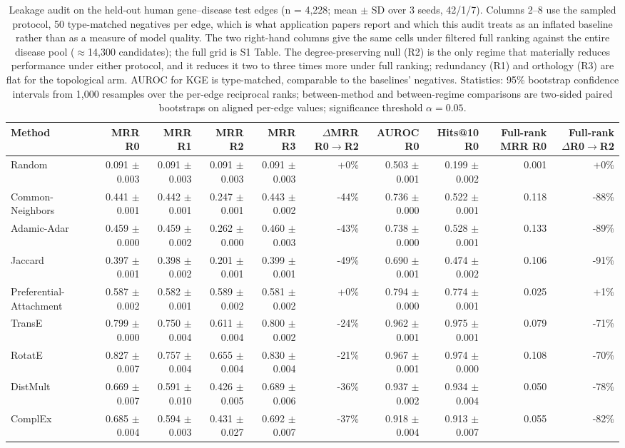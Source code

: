 \begin{table}[H]
\centering
\caption{Leakage audit on the held-out human gene--disease test edges (n = 4,228; mean $\pm$ SD over 3 seeds, 42/1/7). Columns 2--8 use the sampled protocol, 50 type-matched negatives per edge, which is what application papers report and which this audit treats as an inflated baseline rather than as a measure of model quality. The two right-hand columns give the same cells under filtered full ranking against the entire disease pool ($\approx$14,300 candidates); the full grid is S1 Table. The degree-preserving null (R2) is the only regime that materially reduces performance under either protocol, and it reduces it two to three times more under full ranking; redundancy (R1) and orthology (R3) are flat for the topological arm. AUROC for KGE is type-matched, comparable to the baselines' negatives. Statistics: 95\% bootstrap confidence intervals from 1,000 resamples over the per-edge reciprocal ranks; between-method and between-regime comparisons are two-sided paired bootstraps on aligned per-edge values; significance threshold $\alpha = 0.05$.}
\label{tab:audit}
\begin{tabular}{lrrrrrrrrr}
\toprule
Method & MRR R0 & MRR R1 & MRR R2 & MRR R3 & $\Delta$MRR R0$\to$R2 & AUROC R0 & Hits@10 R0 & Full-rank MRR R0 & Full-rank $\Delta$R0$\to$R2 \\
\midrule
Random & 0.091 $\pm$ 0.003 & 0.091 $\pm$ 0.003 & 0.091 $\pm$ 0.003 & 0.091 $\pm$ 0.003 & +0\% & 0.503 $\pm$ 0.001 & 0.199 $\pm$ 0.002 & 0.001 & +0\% \\
Common-Neighbors & 0.441 $\pm$ 0.001 & 0.442 $\pm$ 0.001 & 0.247 $\pm$ 0.001 & 0.443 $\pm$ 0.002 & -44\% & 0.736 $\pm$ 0.000 & 0.522 $\pm$ 0.001 & 0.118 & -88\% \\
Adamic-Adar & 0.459 $\pm$ 0.000 & 0.459 $\pm$ 0.002 & 0.262 $\pm$ 0.000 & 0.460 $\pm$ 0.003 & -43\% & 0.738 $\pm$ 0.000 & 0.528 $\pm$ 0.001 & 0.133 & -89\% \\
Jaccard & 0.397 $\pm$ 0.001 & 0.398 $\pm$ 0.002 & 0.201 $\pm$ 0.001 & 0.399 $\pm$ 0.001 & -49\% & 0.690 $\pm$ 0.001 & 0.474 $\pm$ 0.002 & 0.106 & -91\% \\
Preferential-Attachment & 0.587 $\pm$ 0.002 & 0.582 $\pm$ 0.001 & 0.589 $\pm$ 0.002 & 0.581 $\pm$ 0.002 & +0\% & 0.794 $\pm$ 0.000 & 0.774 $\pm$ 0.001 & 0.025 & +1\% \\
TransE & 0.799 $\pm$ 0.000 & 0.750 $\pm$ 0.004 & 0.611 $\pm$ 0.004 & 0.800 $\pm$ 0.002 & -24\% & 0.962 $\pm$ 0.001 & 0.975 $\pm$ 0.001 & 0.079 & -71\% \\
RotatE & 0.827 $\pm$ 0.007 & 0.757 $\pm$ 0.004 & 0.655 $\pm$ 0.004 & 0.830 $\pm$ 0.004 & -21\% & 0.967 $\pm$ 0.001 & 0.974 $\pm$ 0.000 & 0.108 & -70\% \\
DistMult & 0.669 $\pm$ 0.007 & 0.591 $\pm$ 0.010 & 0.426 $\pm$ 0.005 & 0.689 $\pm$ 0.006 & -36\% & 0.937 $\pm$ 0.002 & 0.934 $\pm$ 0.004 & 0.050 & -78\% \\
ComplEx & 0.685 $\pm$ 0.004 & 0.594 $\pm$ 0.003 & 0.431 $\pm$ 0.027 & 0.692 $\pm$ 0.007 & -37\% & 0.918 $\pm$ 0.004 & 0.913 $\pm$ 0.007 & 0.055 & -82\% \\
\bottomrule
\end{tabular}
\end{table}

